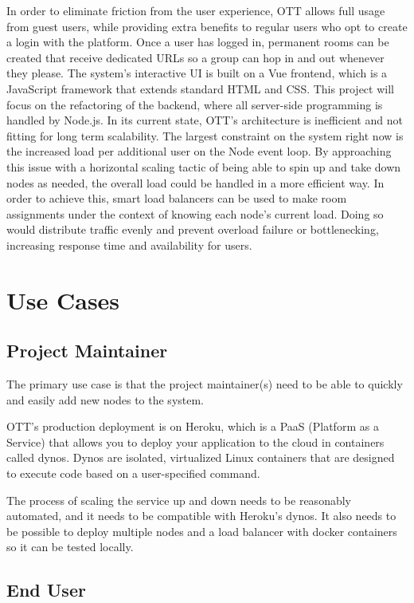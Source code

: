 In order to eliminate friction from the user experience, OTT allows full usage from guest users, while providing extra
benefits to regular users who opt to create a login with the platform. Once a user has logged in, permanent rooms can
be created that receive dedicated URLs so a group can hop in and out whenever they please. The system's interactive UI
is built on a Vue frontend, which is a JavaScript framework that extends standard HTML and CSS. This project will focus
on the refactoring of the backend, where all server-side programming is handled by Node.js. In its current state, OTT's
architecture is inefficient and not fitting for long term scalability. The largest constraint on the system right now is
the increased load per additional user on the Node event loop. By approaching this issue with a horizontal scaling tactic
of being able to spin up and take down nodes as needed, the overall load could be handled in a more efficient way. In
order to achieve this, smart load balancers can be used to make room assignments under the context of knowing each node's
current load. Doing so would distribute traffic evenly and prevent overload failure or bottlenecking, increasing response
time and availability for users.


\section{Use Cases}

\subsection{Project Maintainer}

The primary use case is that the project maintainer(s) need to be able to quickly and easily add new nodes to the system.

OTT's production deployment is on Heroku, which is a PaaS (Platform as a Service) that allows you to deploy your application to the
cloud in containers called dynos. Dynos are isolated, virtualized Linux containers that are designed to execute code based on a
user-specified command.

The process of scaling the service up and down needs to be reasonably automated, and it needs to be compatible with Heroku's dynos.
It also needs to be possible to deploy multiple nodes and a load balancer with docker containers so it can be tested locally.

\subsection{End User}

